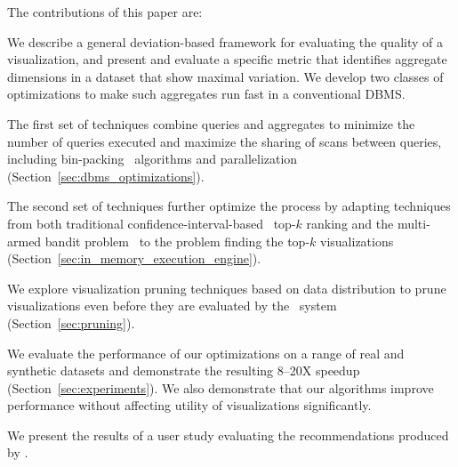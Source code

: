 The contributions of this paper are:
\begin{denselist}
\item We describe a general deviation-based framework for evaluating the quality of a visualization,
and present and evaluate a specific metric that identifies aggregate dimensions in a dataset that
show maximal variation.  We develop two classes of optimizations to make such aggregates run fast 
in a conventional DBMS.
  \item The first set of techniques
  combine queries and aggregates to minimize the number of queries executed and 
  maximize the sharing of scans between queries, 
  including bin-packing~\cite{garey} algorithms and parallelization
  (Section~\ref{sec:dbms_optimizations}).
  \item The second set of techniques further optimize the process by adapting techniques 
  from both traditional confidence-interval-based~\cite{hoeffding1963probability} top-$k$ ranking and the
   multi-armed bandit problem~\cite{bandits} 
   to the problem finding the top-$k$ visualizations (Section~\ref{sec:in_memory_execution_engine}).
  \item We explore visualization pruning techniques based on data distribution
  to prune visualizations even before they are evaluated by the \SeeDB\ system 
  (Section~\ref{sec:pruning}).
  \item We evaluate the performance of our optimizations on a range of
  real and synthetic datasets and demonstrate the resulting 8--20X speedup 
  (Section~\ref{sec:experiments}). We also demonstrate that our algorithms
  improve performance without affecting utility of visualizations significantly.
  \item We present the results of a user study evaluating the recommendations produced by \SeeDB.
\end{denselist}




